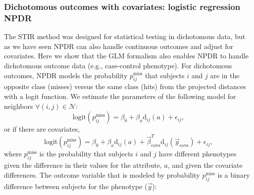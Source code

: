 \documentclass{bioinfo}
\begin{document}
\subsubsection{Dichotomous outcomes with covariates: logistic regression NPDR}
The STIR method was designed for statistical testing in dichotomous data, but as we have seen NPDR can also handle continuous outcomes and adjust for covariates.
Here we show that the GLM formalism also enables NPDR to handle dichotomous outcome data (e.g., case-control phenotype).
For dichotomous outcomes, NPDR models the probability $p^{\text{miss}}_{ij}$ that subjects $i$ and $j$ are in the opposite class (misses) versus the same class (hits) from the projected distances with a logit function.
We estimate the parameters of the following model for neighbors $\forall(i,j) \in \mathcal{N}$:   
\begin{equation}\label{eq:logit_nocovar}
\text{logit}(p^{\text{miss}}_{ij}) = \beta_0 + \beta_a \text{d}_{ij}(a) + \epsilon_{ij},   
\end{equation}
or if there are covariates,
\begin{equation}\label{eq:too_logit}
\text{logit}(p^{\text{miss}}_{ij}) = \beta_0 + \beta_a \text{d}_{ij}(a) + \vec{\beta}^{T}_{\text{covs}} \text{d}_{ij}(\vec{y}_{\text{covs}}) + \epsilon_{ij},   
\end{equation}
where $p^{\text{miss}}_{ij}$ is the probability that subjects $i$ and $j$ have different phenotypes given the difference in their values for the attribute, $a$, and given the covariate differences.
The outcome variable that is modeled by probability $p^{\text{miss}}_{ij}$ is a binary difference between subjects for the phenotype ($\vec{y}$):
   
\end{document}
